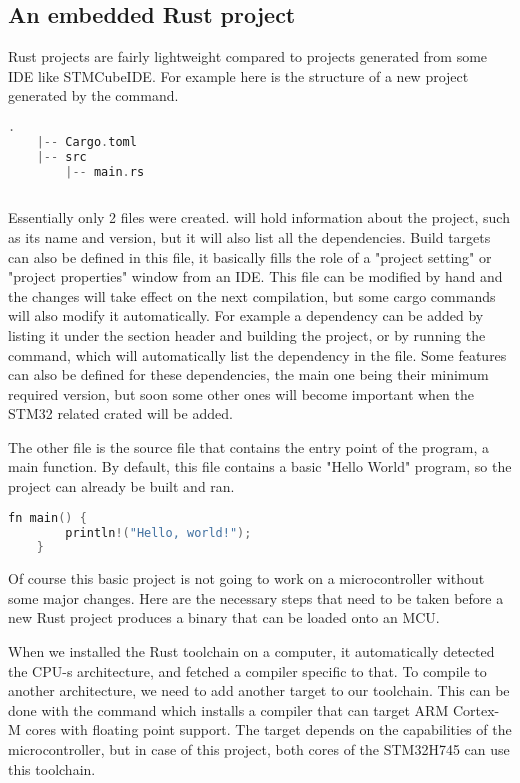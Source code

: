 \subsection{An embedded Rust project}

Rust projects are fairly lightweight compared to projects generated from some IDE like STMCubeIDE. For example here is the structure of a new project generated by the  command.

\begin{lstlisting}[language=C,frame=single,float=!ht]
    .
    |-- Cargo.toml
    |-- src
        |-- main.rs
    
\end{lstlisting}

Essentially only 2 files were created.  will hold information about the project, such as its name and version, but it will also list all the dependencies. Build targets can also be defined in this file, it basically fills the role of a "project setting" or "project properties" window from an IDE. This file can be modified by hand and the changes will take effect on the next compilation, but some cargo commands will also modify it automatically. For example a dependency can be added by listing it under the \mycode{[dependencies]} section header and building the project, or by running the  command, which will automatically list the dependency in the file. Some features can also be defined for these dependencies, the main one being their minimum required version, but soon some other ones will become important when the STM32 related crated will be added.

The other file is the  source file that contains the entry point of the program, a main function. By default, this file contains a basic "Hello World" program, so the project can already be built and ran.

\begin{lstlisting}[language=C,frame=single,float=!ht]
    fn main() {
        println!("Hello, world!");
    }
\end{lstlisting}

Of course this basic project is not going to work on a microcontroller without some major changes. Here are the necessary steps that need to be taken before a new Rust project produces a binary that can be loaded onto an MCU.

When we installed the Rust toolchain on a computer, it automatically detected the CPU-s architecture, and fetched a compiler specific to that. To compile to another architecture, we need to add another target to our toolchain. This can be done with the command  which installs a compiler that can target ARM Cortex-M cores with floating point support. The target depends on the capabilities of the microcontroller, but in case of this project, both cores of the STM32H745 can use this toolchain.

